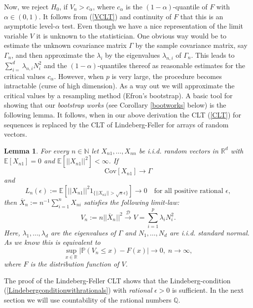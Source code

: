 \documentclass[sn-mathphys,Numbered]{sn-jnl}%
\theoremstyle{thmstyleone}%
\theoremstyle{thmstyletwo}%
\newtheorem{lemma}{Lemma}%
\theoremstyle{thmstylethree}%
\begin{document}
Now, we reject $H_0$, if $V_n > c_\alpha$, where $c_\alpha$ is the $(1-\alpha)$-quantile of $F$ with $\alpha \in (0,1)$. It follows from (\ref{VCLT}) and continuity of $F$ that this is an asymptotic level-$\alpha$ test. Even though we have a nice representation of the limit variable $V$ it is unknown to the statistician. One obvious way would be to estimate the unknown covariance matrix $\Gamma$ by the sample covariance matrix, say $\Gamma_n$, and then approximate the $\lambda_i$ by the eigenvalues $\lambda_{n,i}$ of $\Gamma_n$. This leads to
$\sum_{i=}^d \lambda_{n,i} N_i^2$ and the $(1-\alpha)$-quantiles thereof as reasonable estimates for the critical values $c_\alpha$. However,
when $p$ is very large, the procedure becomes intractable (curse of high dimension). As a way out we will approximate the critical values by a
resampling method (Efron's bootstrap). A basic tool for showing that our \emph{bootstrap works} (see Corollary \ref{bootworks} below) is the following lemma. It follows, when in our above derivation the CLT (\ref{CLT}) for sequences is replaced by the CLT of Lindeberg-Feller for arrays of random vectors.\\

\begin{lemma} \label{convVn} For every $n \in \mathbb{N}$ let $X_{n1},\ldots,X_{nn}$ be i.i.d. random vectors in $\mathbb{R}^d$ with
$\mathbb{E}[X_{n1}]=0$ and $\mathbb{E}[||X_{n1}||^2]< \infty$. If
\begin{equation}
 \text{Cov}[X_{n1}] \rightarrow \Gamma
\end{equation}
and
\begin{equation} \label{Lindebergconditionwithrationals}
 L_n(\epsilon) := \mathbb{E}[||X_{n1}||^2 1_{\{||X_{n1}||> \sqrt{n} \epsilon\}}] \rightarrow 0 \quad \text{for all positive rational }  \epsilon,
\end{equation}
then $\overline{X}_n := n^{-1} \sum_{i=1}^n X_{ni}$ satisfies the following limit-law:
$$
 V_n:= n ||\overline{X}_n||^2 \stackrel{\mathcal{D}}{\rightarrow} V=\sum_{i=1}^p \lambda_i N_i^2.
$$
Here, $\lambda_1,\dots,\lambda_d$ are the eigenvalues of $\Gamma$ and $N_1,\ldots,N_d$ are i.i.d. standard normal. As we know
this is equivalent to
$$
  \sup_{x \in \mathbb{R}}|\mathbb{P}(V_n \le x)-F(x)| \rightarrow 0, \;  n \rightarrow \infty,
$$
where $F$ is the distribution function of $V$.
\end{lemma}

\vspace{0.5cm}
The proof of the Lindeberg-Feller CLT shows that the Lindeberg-condition (\ref{Lindebergconditionwithrationals}) with \emph{rational} $\epsilon >0$  is sufficient. In the next section we will use countability of the rational numbers $\mathbb{Q}.$
\end{document}

